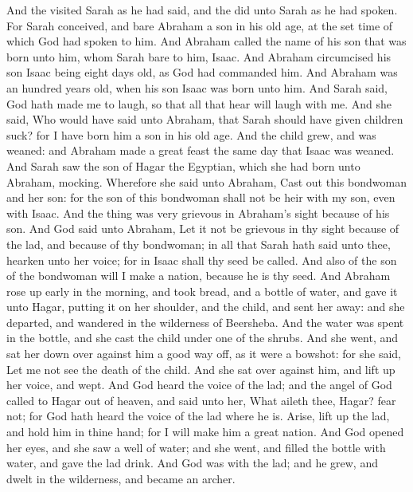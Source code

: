 \begin{biblechapter} %
 And the \LORD visited Sarah as he had said, and the \LORD did unto Sarah as he had spoken.
\verse For Sarah conceived, and bare Abraham a son in his old age, at the set time of which God had spoken to him.
\verse And Abraham called the name of his son that was born unto him, whom Sarah bare to him, Isaac.
\verse And Abraham circumcised his son Isaac being eight days old, as God had commanded him.
\verse And Abraham was an hundred years old, when his son Isaac was born unto him.
\verse And Sarah said, God hath made me to laugh, so that all that hear will laugh with me.
\verse And she said, Who would have said unto Abraham, that Sarah should have given children suck? for I have born him a son in his old age.
 And the child grew, and was weaned: and Abraham made a great feast the same day that Isaac was weaned.
\verse And Sarah saw the son of Hagar the Egyptian, which she had born unto Abraham, mocking.
\verse Wherefore she said unto Abraham, Cast out this bondwoman and her son: for the son of this bondwoman shall not be heir with my son, even with Isaac.
\verse And the thing was very grievous in Abraham's sight because of his son.
\verse And God said unto Abraham, Let it not be grievous in thy sight because of the lad, and because of thy bondwoman; in all that Sarah hath said unto thee, hearken unto her voice; for in Isaac shall thy seed be called.
\verse And also of the son of the bondwoman will I make a nation, because he is thy seed.
\verse And Abraham rose up early in the morning, and took bread, and a bottle of water, and gave it unto Hagar, putting it on her shoulder, and the child, and sent her away: and she departed, and wandered in the wilderness of Beersheba.
\verse And the water was spent in the bottle, and she cast the child under one of the shrubs.
\verse And she went, and sat her down over against him a good way off, as it were a bowshot: for she said, Let me not see the death of the child. And she sat over against him, and lift up her voice, and wept.
\verse And God heard the voice of the lad; and the angel of God called to Hagar out of heaven, and said unto her, What aileth thee, Hagar? fear not; for God hath heard the voice of the lad where he is.
\verse Arise, lift up the lad, and hold him in thine hand; for I will make him a great nation.
\verse And God opened her eyes, and she saw a well of water; and she went, and filled the bottle with water, and gave the lad drink.
\verse And God was with the lad; and he grew, and dwelt in the wilderness, and became an archer.

\end{biblechapter}
